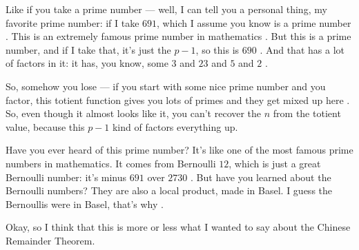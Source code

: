 \begin{speech}[00:21:04 - 00:22:25]
Like if you take a prime number --- well, I can tell you a personal thing, my favorite prime number: if I take $691$, which I assume you know is a prime number . This is an extremely famous prime number in mathematics . But this is a prime number, and if I take that, it's just the $p - 1$, so this is $690$ . And that has a lot of factors in it: it has, you know, some $3$ and $23$ and $5$ and $2$ .

So, somehow you lose --- if you start with some nice prime number and you factor, this totient function gives you lots of primes and they get mixed up here . So, even though it almost looks like it, you can't recover the $n$ from the totient value, because this $p - 1$ kind of factors everything up.

Have you ever heard of this prime number? It's like one of the most famous prime numbers in mathematics. It comes from Bernoulli $12$, which is just a great Bernoulli number: it's minus $691$ over $2730$ . But have you learned about the Bernoulli numbers? They are also a local product, made in Basel. I guess the Bernoullis were in Basel, that's why .

Okay, so I think that this is more or less what I wanted to say about the Chinese Remainder Theorem.
\end{speech}

\begin{content}

\end{content}

